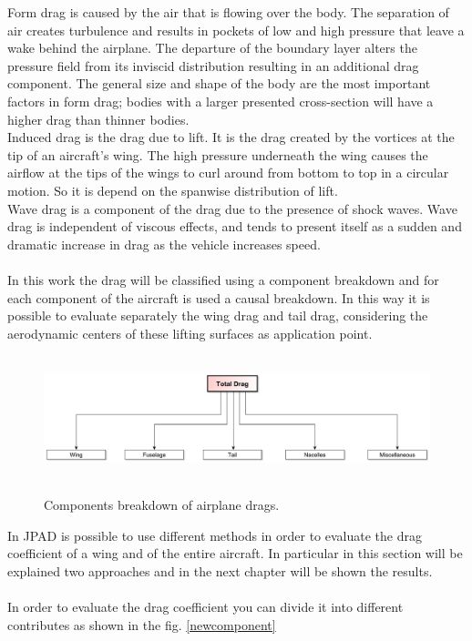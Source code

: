 Form drag is caused by the air that is flowing over the body. The separation of air creates turbulence and results in pockets of low and high pressure that leave a wake behind the airplane. The departure of the boundary layer alters the pressure field from its inviscid distribution resulting in an additional drag component. The general size and shape of the body are the most important factors in form drag; bodies with a larger presented cross-section will have a higher drag than thinner bodies.\\
Induced drag is the drag due to lift. It is the drag created by the vortices at the tip of an aircraft's wing. The high pressure underneath the wing causes the airflow at the tips of the wings to curl around from bottom to top in a circular motion. So it is depend on the spanwise distribution of lift. \\
Wave drag is a component of the drag due to the presence of shock waves. Wave drag is independent of viscous effects, and tends to present itself as a sudden and dramatic increase in drag as the vehicle increases speed.
\\ \\ 
In this work the drag will be classified using a component breakdown and for each component of the aircraft is used a causal breakdown. In this way it is possible to evaluate separately the wing drag and tail drag, considering the aerodynamic centers of these lifting surfaces as application point.
\begin{figure}[H]
\centering
{\includegraphics[height=3.6cm]{Immagini/dragco.pdf}} 
\caption{Components breakdown of airplane drags.}
\end{figure}
In JPAD is possible to use different methods in order to evaluate the drag coefficient of a wing and of the entire aircraft. In particular in this section will be explained two approaches and in the next chapter will be shown the results.\\ \\
In order to evaluate the drag coefficient you can divide it into different contributes as shown in the fig. \ref{newcomponent}


